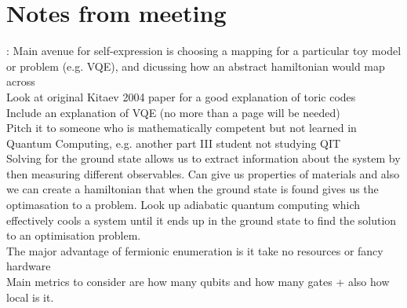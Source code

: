 \documentclass[twoside]{article}
\begin{document}
\section{Notes from meeting}:
Main avenue for self-expression is choosing a mapping for a particular toy model or problem (e.g. VQE), and dicussing how an abstract hamiltonian would map across\\
Look at original Kitaev 2004 paper for a good explanation of toric codes\\
Include an explanation of VQE (no more than a page will be needed)\\
Pitch it to someone who is mathematically competent but not learned in Quantum Computing, e.g. another part III student not studying QIT\\
Solving for the ground state allows us to extract information about the system by then measuring different observables. Can give us properties of materials and also we can create a hamiltonian that when the ground state is found gives us the optimasation to a problem. Look up adiabatic quantum computing which effectively cools a system until it ends up in the ground state to find the solution to an  optimisation problem.\\
The major advantage of fermionic enumeration is it take no resources or fancy hardware\\
Main metrics to consider are how many qubits and how many gates + also how local is it.
\end{document}
